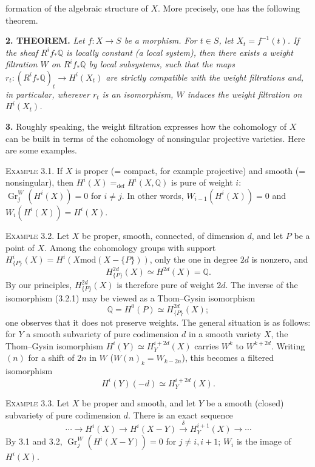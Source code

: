 \documentclass[8pt]{extarticle}
\newcommand{\DSourceFolio}{--}
\newcommand{\DAuthorityPage}{--}
\newcommand{\SourcePage}[2]{%
  \renewcommand{\DSourceFolio}{#1}%
  \renewcommand{\DAuthorityPage}{#2}%
  \thispagestyle{dpage}%
}
\newcommand{\EndSourcePage}{\clearpage}
\newcommand{\ReaderFont}{\fontsize{7.35}{8.15}\selectfont}
\newcommand{\NumPara}[1]{\par\noindent\textbf{#1}\enspace}
\newcommand{\NamedPara}[1]{\par\noindent\textsc{#1}\enspace}
\newcommand{\TheoremPara}[1]{\par\noindent\textbf{#1}\enspace\itshape}
\newcommand{\EndTheorem}{\par\normalfont}
\newcommand{\Q}{\mathbb{Q}}
\newcommand{\Gr}{\operatorname{Gr}}
\begin{document}
\vfill
{}
\EndSourcePage

\SourcePage{80}{2}
\ReaderFont
formation of the algebraic structure of \(X\). More precisely, one has the following theorem.

\TheoremPara{2. THEOREM.} Let \(f:X\to S\) be a morphism. For \(t\in S\), let \(X_t=f^{-1}(t)\). If the sheaf \(R^if_*\Q\) is locally constant (a local system), then there exists a weight filtration \(W\) on \(R^if_*\Q\) by local subsystems, such that the maps \(r_t:(R^if_*\Q)_t\to H^i(X_t)\) are strictly compatible with the weight filtrations and, in particular, wherever \(r_t\) is an isomorphism, \(W\) induces the weight filtration on \(H^i(X_t)\).\EndTheorem

\NumPara{3.} Roughly speaking, the weight filtration expresses how the cohomology of \(X\) can be built in terms of the cohomology of nonsingular projective varieties. Here are some examples.

\NamedPara{Example 3.1.} If \(X\) is proper (= compact, for example projective) and smooth (= nonsingular), then \(H^i(X)=_{\mathrm{def}}H^i(X,\Q)\) is pure of weight \(i\): \(\Gr_j^W(H^i(X))=0\) for \(i\ne j\). In other words, \(W_{i-1}(H^i(X))=0\) and \(W_i(H^i(X))=H^i(X)\).

\NamedPara{Example 3.2.} Let \(X\) be proper, smooth, connected, of dimension \(d\), and let \(P\) be a point of \(X\). Among the cohomology groups with support \(H^i_{\{P\}}(X)=H^i(X\mathbin{\mathrm{mod}}(X-\{P\}))\), only the one in degree \(2d\) is nonzero, and
\begin{equation}\tag{3.2.1}
H^{2d}_{\{P\}}(X)\simeq H^{2d}(X)=\Q.
\end{equation}
By our principles, \(H^{2d}_{\{P\}}(X)\) is therefore pure of weight \(2d\). The inverse of the isomorphism (3.2.1) may be viewed as a Thom--Gysin isomorphism
\[
\Q=H^0(P)\simeq H^{2d}_{\{P\}}(X);
\]
one observes that it does not preserve weights. The general situation is as follows: for \(Y\) a smooth subvariety of pure codimension \(d\) in a smooth variety \(X\), the Thom--Gysin isomorphism \(H^i(Y)\simeq H_Y^{i+2d}(X)\) carries \(W^k\) to \(W^{k+2d}\). Writing \((n)\) for a shift of \(2n\) in \(W\) (\(W(n)_k=W_{k-2n}\)), this becomes a filtered isomorphism
\[
H^i(Y)(-d)\simeq H_Y^{i+2d}(X).
\]

\NamedPara{Example 3.3.} Let \(X\) be proper and smooth, and let \(Y\) be a smooth (closed) subvariety of pure codimension \(d\). There is an exact sequence
\[
\cdots\to H^i(X)\to H^i(X-Y)\xrightarrow{\delta}H_Y^{i+1}(X)\to\cdots
\]
By 3.1 and 3.2, \(\Gr_j^W(H^i(X-Y))=0\) for \(j\ne i,i+1\); \(W_i\) is the image of \(H^i(X)\).
\end{document}
